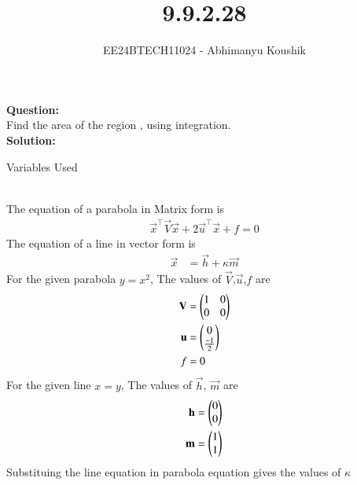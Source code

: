 \documentclass[journal]{IEEEtran}
\begin{document}

\vspace{3cm}

\title{9.9.2.28}
\author{EE24BTECH11024 - Abhimanyu Koushik}
{\let\newpage\relax\maketitle}
\textbf{Question:}\\
Find the area of the region , using integration.\\
\textbf{Solution:}
\begin{table}[h!]    
  \centering
  
  \caption{Variables Used}
  \label{tab1-1.9-6}
\end{table}\\
The equation of a parabola in Matrix form is
\begin{align}
\vec{x}^\top\vec{V}\vec{x} + 2\vec{u}^\top\vec{x} + f = 0
\end{align}
The equation of a line in vector form is
\begin{align}
\vec{x}&=\vec{h}+\kappa\vec{m}
\end{align}
For the given parabola $y=x^2$, The values of $\vec{V}$,$\vec{u}$,$f$ are
\begin{align}
\mathbf{V}&=\begin{pmatrix}1 & 0\\0 & 0\end{pmatrix}\\
\mathbf{u}&=\begin{pmatrix}0\\\frac{-1}{2}\end{pmatrix}\\
f&=0
\end{align}
For the given line $x=y$, The values of $\vec{h}$, $\vec{m}$ are
\begin{align}
\mathbf{h}&=\begin{pmatrix}0\\0\end{pmatrix}\\
\mathbf{m}&=\begin{pmatrix}1\\1\end{pmatrix}
\end{align}
Substituing the line equation in parabola equation gives the values of $\kappa$
\end{document}
